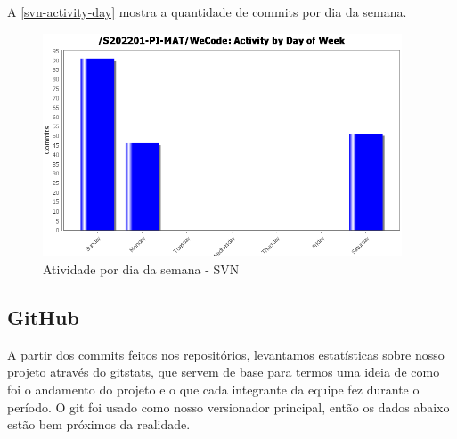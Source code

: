 A \autoref{svn-activity-day} mostra a quantidade de commits por dia da semana.
\begin{figure}[H]
	\centering
	\caption{\label{svn-activity-day}Atividade por dia da semana - SVN}
	\includegraphics[width=0.95\textwidth]{../imagens/stats/svn-activity-day.png}
\end{figure}

\subsection{GitHub}
A partir dos commits feitos nos repositórios, levantamos estatísticas sobre nosso projeto através do \gls{gitstats}, que servem de base para termos uma ideia de como foi o andamento do projeto e o que cada integrante da equipe fez durante o período.
O \gls{git} foi usado como nosso versionador principal, então os dados abaixo estão bem próximos da realidade.

